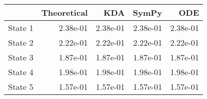 \begin{tabular}{lrrrr}
\toprule
{} &  Theoretical &      KDA &    SymPy &      ODE \\
\midrule
State 1 &     2.38e-01 & 2.38e-01 & 2.38e-01 & 2.38e-01 \\
State 2 &     2.22e-01 & 2.22e-01 & 2.22e-01 & 2.22e-01 \\
State 3 &     1.87e-01 & 1.87e-01 & 1.87e-01 & 1.87e-01 \\
State 4 &     1.98e-01 & 1.98e-01 & 1.98e-01 & 1.98e-01 \\
State 5 &     1.57e-01 & 1.57e-01 & 1.57e-01 & 1.57e-01 \\
\bottomrule
\end{tabular}
